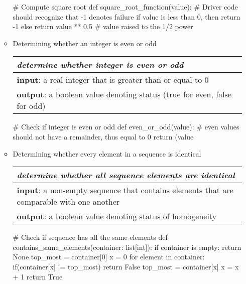\documentclass{article}
\begin{document}
\begin{enumerate}
\begin{itemize}
\begin{python}
# Compute square root
def square_root_function(value):
    # Driver code should recognize that -1 denotes failure
    if value is less than 0, then return -1
    else return value ** 0.5 # value raised to the 1/2 power
\end{python}

\item Determining whether an integer is even or odd

\begin{table}[!htbp]
\centering
\begin{tabular}{|l|}
\hline
\textit{determine whether integer is even or odd} \\ \hline
\textbf{input}: a real integer that is greater than or equal to 0 \\ \hline
\textbf{output}: a boolean value denoting status (true for even, false for odd) \\ \hline
\end{tabular}
\end{table}

\begin{python}
# Check if integer is even or odd
def even_or_odd(value):
    # even values should not have a remainder, thus equal to 0
    return (value %

\end{python}

\newpage

\item Determining whether every element in a sequence is identical

\begin{table}[!htbp]
\centering
\begin{tabular}{|l|}
\hline
\textit{determine whether all sequence elements are identical} \\ \hline
\textbf{input}: a non-empty sequence that contains elements that are comparable with one another \\ \hline
\textbf{output}: a boolean value denoting status of homogeneity \\ \hline
\end{tabular}


\end{table}

\begin{python}
# Check if sequence has all the same elements
def contains_same_elements(container: list[int]):
    if container is empty:
        return None
    top_most = container[0]
    x = 0
    for element in container:
        if(container[x] != top_most)
            return False
        top_most = container[x]
        x = x + 1
    return True
\end{python}



\end{itemize}
\end{enumerate}
\end{document}
